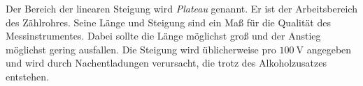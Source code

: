 Der Bereich der linearen Steigung wird \textit{Plateau} genannt. Er ist der Arbeitsbereich des Zählrohres. Seine Länge und Steigung sind ein Maß 
für die Qualität des Messinstrumentes. Dabei sollte die Länge möglichst groß und der Anstieg möglichst gering ausfallen. Die Steigung wird üblicherweise
pro $\qty{100}{\volt}$ angegeben und wird durch Nachentladungen verursacht, die trotz des Alkoholzusatzes entstehen.
